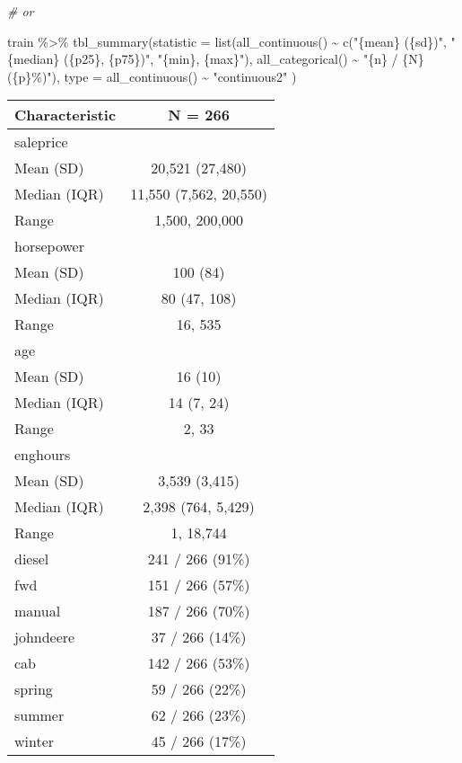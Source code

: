 \documentclass[
]{article}
\newenvironment{Shaded}{\begin{snugshade}}{\end{snugshade}}
\newcommand{\AttributeTok}[1]{\textcolor[rgb]{0.77,0.63,0.00}{#1}}
\newcommand{\CommentTok}[1]{\textcolor[rgb]{0.56,0.35,0.01}{\textit{#1}}}
\newcommand{\FunctionTok}[1]{\textcolor[rgb]{0.00,0.00,0.00}{#1}}
\newcommand{\NormalTok}[1]{#1}
\newcommand{\SpecialCharTok}[1]{\textcolor[rgb]{0.00,0.00,0.00}{#1}}
\newcommand{\StringTok}[1]{\textcolor[rgb]{0.31,0.60,0.02}{#1}}
\begin{document}
\begin{Shaded}
\begin{Highlighting}[]
\CommentTok{\# or }

\NormalTok{train }\SpecialCharTok{\%\textgreater{}\%} 
  \FunctionTok{tbl\_summary}\NormalTok{(}\AttributeTok{statistic =} \FunctionTok{list}\NormalTok{(}\FunctionTok{all\_continuous}\NormalTok{() }\SpecialCharTok{\textasciitilde{}} \FunctionTok{c}\NormalTok{(}\StringTok{"\{mean\} (\{sd\})"}\NormalTok{,}
                                                    \StringTok{"\{median\} (\{p25\}, \{p75\})"}\NormalTok{,}
                                                    \StringTok{"\{min\}, \{max\}"}\NormalTok{),}
                              \FunctionTok{all\_categorical}\NormalTok{() }\SpecialCharTok{\textasciitilde{}} \StringTok{"\{n\} / \{N\} (\{p\}\%)"}\NormalTok{),}
              \AttributeTok{type =} \FunctionTok{all\_continuous}\NormalTok{() }\SpecialCharTok{\textasciitilde{}} \StringTok{"continuous2"}
\NormalTok{  )}
\end{Highlighting}
\end{Shaded}

\begin{longtable}[]{@{}lc@{}}
\toprule()
\textbf{Characteristic} & \textbf{N = 266} \\
\midrule()
\endhead
saleprice & \\
Mean (SD) & 20,521 (27,480) \\
Median (IQR) & 11,550 (7,562, 20,550) \\
Range & 1,500, 200,000 \\
horsepower & \\
Mean (SD) & 100 (84) \\
Median (IQR) & 80 (47, 108) \\
Range & 16, 535 \\
age & \\
Mean (SD) & 16 (10) \\
Median (IQR) & 14 (7, 24) \\
Range & 2, 33 \\
enghours & \\
Mean (SD) & 3,539 (3,415) \\
Median (IQR) & 2,398 (764, 5,429) \\
Range & 1, 18,744 \\
diesel & 241 / 266 (91\%) \\
fwd & 151 / 266 (57\%) \\
manual & 187 / 266 (70\%) \\
johndeere & 37 / 266 (14\%) \\
cab & 142 / 266 (53\%) \\
spring & 59 / 266 (22\%) \\
summer & 62 / 266 (23\%) \\
winter & 45 / 266 (17\%) \\
\bottomrule()
\end{longtable}
\end{document}
